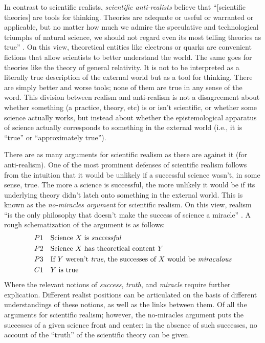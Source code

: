 In contrast to scientific realists, \textit{scientific anti-realists} believe that ``[scientific theories] are tools for thinking. Theories are adequate or useful or warranted or applicable, but no matter how much we admire the speculative and technological triumphs of natural science, we should not regard even its most telling theories as true'' \autocite[21]{hacking1983}. On this view, theoretical entities like electrons or quarks are convenient fictions that allow scientists to better understand the world. The same goes for theories like the theory of general relativity. It is not to be interpreted as a literally true description of the external world but as a tool for thinking. There are simply better and worse tools; none of them are true in any sense of the word. This division between realism and anti-realism is not a disagreement about whether something (a practice, theory, etc) is or isn’t scientific, or whether some science actually works, but instead about whether the epistemological apparatus of science actually corresponds to something in the external world (i.e., it is “true” or “approximately true”).

There are as many arguments for scientific realism as there are against it (for anti-realism). One of the most prominent defenses of scientific realism follows from the intuition that it would be unlikely if a successful science wasn't, in some sense, true. The more a science is successful, the more unlikely it would be if its underlying theory didn't latch onto something in the external world. This is known as the \textit{no-miracles argument} for scientific realism. On this view, realism ``is the only philosophy that doesn't make the success of science a miracle'' \autocite[73]{putnam1975}. A rough schematization of the argument is as follows:
\begin{align*}
    & P1 \quad \text{Science $X$ is \textit{successful}} \\
    & P2 \quad \text{Science $X$ has theoretical content $Y$} \\
    & P3 \quad \text{If $Y$ weren't \textit{true}, the successes of $X$ would be \textit{miraculous}} \\
    & C1 \quad \text{$Y$ is true}
\end{align*}
\noindent Where the relevant notions of \textit{success}, \textit{truth}, and \textit{miracle} require further explication. Different realist positions can be articulated on the basis of different understandings of these notions, as well as the links between them. Of all the arguments for scientific realism; however, the no-miracles argument puts the successes of a given science front and center: in the absence of such successes, no account of the ``truth'' of the scientific theory can be given.

